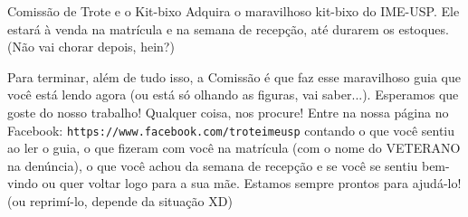 \begin{secao}{Comissão de Trote e o Kit-bixo}
Adquira o maravilhoso kit-bixo do IME-USP. Ele estará à venda na matrícula e na
semana de recepção, até durarem os estoques. (Não vai chorar depois, hein?)

Para terminar, além de tudo isso, a Comissão é que faz esse maravilhoso guia que
você está lendo agora (ou está só olhando as figuras, vai saber...). Esperamos
que goste do nosso trabalho! Qualquer coisa, nos procure! Entre na nossa página
no Facebook: {\tt https://www.facebook.com/troteimeusp} contando o que você 
sentiu ao ler o guia, o que fizeram com você na matrícula (com o nome do 
VETERANO na denúncia), o que
você achou da semana de recepção e se você se sentiu bem-vindo ou quer voltar logo
para a sua mãe. Estamos sempre prontos para ajudá-lo! (ou reprimí-lo, depende
da situação XD)

\end{secao}

